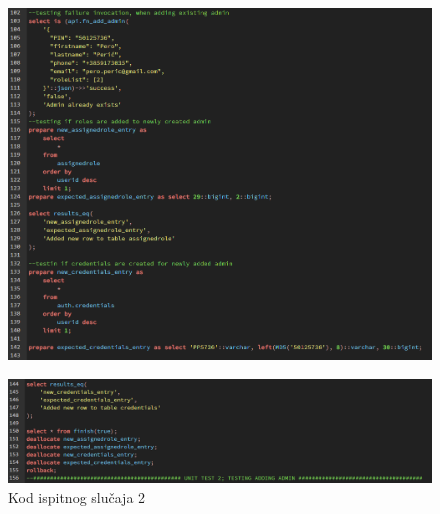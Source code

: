 				\begin{figure}[H]
					\centering
					\includegraphics[width=\textwidth]{slike/unit_tests/ut_2/code_part2.png}
					\label{fig: IS2-code part 2}
				\end{figure}
				\begin{figure}[H]
					\centering
					\includegraphics[width=\textwidth]{slike/unit_tests/ut_2/code_part3.png}
					\caption{Kod ispitnog slučaja 2}
					\label{fig: IS2-code part 3}
				\end{figure}
				\eject

